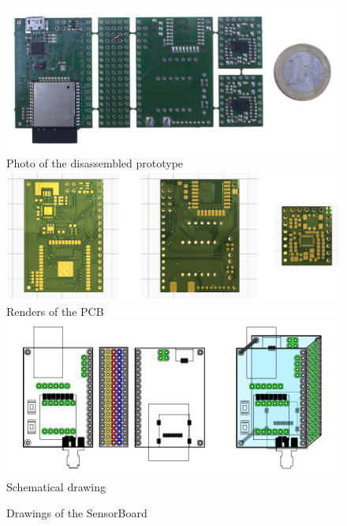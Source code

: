 \begin{figure}
	\centering
	\caption{Drawings of the SensorBoard}
	\label{fig:SensorBoardDrawings}
	\includegraphics[width=\linewidth]{img/PCBphoto.jpg}
	\\Photo of the disassembled prototype\\
	\vspace{0.3cm}
	\includegraphics[width=\linewidth]{img/renders.png}
	\vspace{0.3cm}
	\\Renders of the \ac{PCB}\\
	\vspace{0.3cm}
	\includegraphics[scale=1]{img/SensorBoardDrawing.pdf}
	\\Schematical drawing
\end{figure}
